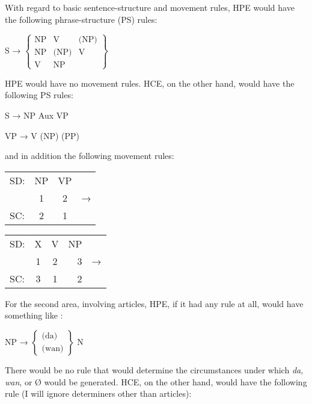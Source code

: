 With regard to basic sentence-structure and movement rules, HPE would have the following phrase-structure (PS) rules: 

\ea\label{ex:86}
S → $\left\{\begin{array}{lcr} \text{NP} & \text{V} & \text{(NP)}\\\text{NP} & \text{(NP)} & \text{V}\\\text{V} & \text{NP} & \end{array}\right\} $ 
\z


\noindent HPE would have no movement rules. HCE, on the other hand, would have the following PS rules:

\ea\label{ex:87}
S → NP Aux VP
\z

\ea\label{ex:88}
VP → V (NP) (PP)
\z

\noindent and in addition the following movement rules:

\ea\label{ex:89}
\begin{tabular}[t]{lccr}
SD: & NP & VP & \\
& 1 & 2 & → \\
SC: & 2 & 1 & \\
\end{tabular}
\z
\ea\label{ex:90}
\begin{tabular}[t]{lccrr}
	SD: & X & V & NP & \\
	& 1 & 2 & 3 &  → \\
	SC: & 3 & 1 & 2 & \\
\end{tabular}
\z

For the second area, involving articles, HPE, if it had any rule at all, would have something like : 

\ea\label{ex:91}
NP → $\left\{\begin{array}{l} \text{(da)}\\ \text{(wan)} \end{array}\right\} $ N
\z
{}

\noindent There would be no rule that would determine the circumstances under which \textit{da}, \textit{wan}, or {\O} would be generated. HCE, on the other hand, would have the following rule (I will ignore determiners other than articles): 

\ea\label{ex:92}
\glt 
\z

\ea\label{ex:93}
\glt 
\z

\ea\label{ex:94}

\glt 
\z

